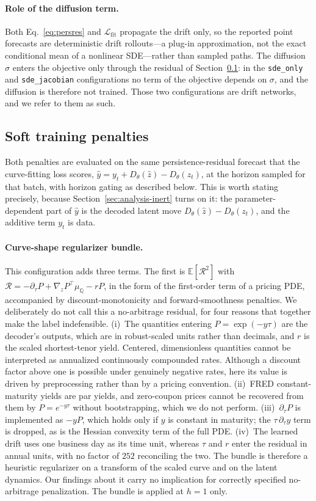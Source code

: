 \documentclass{article} %
\begin{document}
\paragraph{Role of the diffusion term.} Both Eq.~\eqref{eq:persres} and
$\mathcal{L}_{\mathrm{fit}}$ propagate the drift only, so the reported point
forecasts are deterministic drift rollouts---a plug-in approximation, not the exact
conditional mean of a nonlinear SDE---rather than sampled paths. The diffusion
$\sigma$ enters the objective only through the residual of
Section~\ref{subsec:constraints}: in the \texttt{sde\_only} and
\texttt{sde\_jacobian} configurations no term of the objective depends on $\sigma$,
and the diffusion is therefore not trained. Those two configurations are drift
networks, and we refer to them as such.
\subsection{Soft training penalties}
\label{subsec:constraints}
Both penalties are evaluated on the same persistence-residual forecast that the
curve-fitting loss scores, $\hat y = y_t + D_\theta(\hat z) - D_\theta(z_t)$, at the
horizon sampled for that batch, with horizon gating as described below. This is
worth stating precisely, because Section~\ref{sec:analysis-inert} turns on it: the
parameter-dependent part of $\hat y$ is the decoded latent move
$D_\theta(\hat z) - D_\theta(z_t)$, and the additive term $y_t$ is data.
\paragraph{Curve-shape regularizer bundle.} This configuration adds three terms. The
first is $\mathbb{E}[\mathcal{R}^2]$ with
$\mathcal{R}=-\partial_\tau P+\nabla_z P^{\top}\mu_{\mathbb{Q}}-rP$, in the form of
the first-order term of a pricing PDE, accompanied by discount-monotonicity and
forward-smoothness penalties. We deliberately do not call this a no-arbitrage
residual, for four reasons that together make the label indefensible. (i)~The
quantities entering $P=\exp(-y\tau)$ are the decoder's outputs, which are in
robust-scaled units rather than decimals, and $r$ is the scaled shortest-tenor
yield. Centered, dimensionless quantities cannot be interpreted as annualized
continuously compounded rates. Although a discount factor above one is possible
under genuinely negative rates, here its value is driven by preprocessing rather
than by a pricing convention. (ii)~FRED constant-maturity yields are par yields,
and zero-coupon prices cannot be recovered from them by $P=e^{-y\tau}$ without
bootstrapping, which we do not perform. (iii)~$\partial_\tau P$ is implemented as
$-yP$, which holds only if $y$ is constant in maturity; the
$\tau\,\partial_\tau y$ term is dropped, as is the Hessian convexity term of the
full PDE. (iv)~The learned drift uses one business day as its time unit, whereas
$\tau$ and $r$ enter the residual in annual units, with no factor of $252$ reconciling
the two. The bundle is therefore a heuristic regularizer on a transform of the
scaled curve and on the latent dynamics. Our findings about it carry no implication
for correctly specified no-arbitrage penalization. The bundle is applied at $h{=}1$
only.
\end{document}

